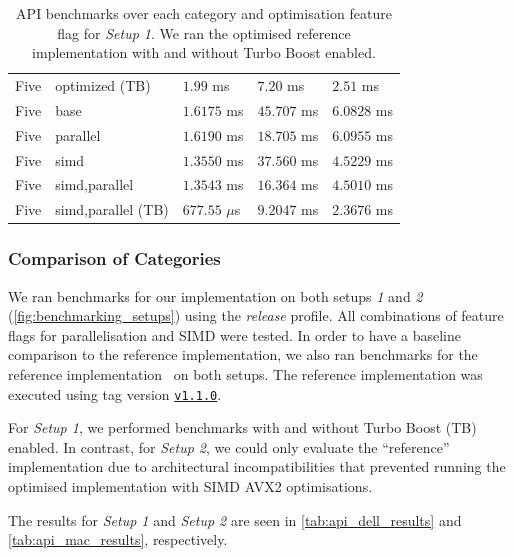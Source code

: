 \documentclass[11pt]{report}
\theoremstyle{definition}
\theoremstyle{plain}
\begin{document}
\begin{table}[H]
\begin{tabular}{l|l|lll}
    Five \cite{aguilar2023return}  & optimized (TB)     & $1.99$ ms       & $7.20$ ms   & $2.51$ ms       \\
    \arrayrulecolor{lightgray}\hline\arrayrulecolor{black}
    Five                           & base               & $1.6175$ ms     & $45.707$ ms & $6.0828$ ms     \\
    Five                           & parallel           & $1.6190$ ms     & $18.705$ ms & $6.0955$ ms     \\
    Five                           & simd               & $1.3550$ ms     & $37.560$ ms & $4.5229$ ms     \\
    Five                           & simd,parallel      & $1.3543$ ms     & $16.364$ ms & $4.5010$ ms     \\
    Five                           & simd,parallel (TB) & $677.55$ $\mu$s & $9.2047$ ms & $2.3676$ ms     \\
    \hline
  \end{tabular}
  \caption{API benchmarks over each category and optimisation feature flag for \textit{Setup 1}. We ran the optimised reference implementation \cite{aguilar2023return} with and without Turbo Boost enabled.}
  \label{tab:api_dell_results}
\end{table}

\subsubsection{Comparison of Categories}\label{sub:comparison_categories}

We ran benchmarks for our implementation on both setups \textit{1} and \textit{2} (\autoref{fig:benchmarking_setups}) using the \textit{release} profile. All combinations of feature flags for parallelisation and SIMD were tested. In order to have a baseline comparison to the reference implementation, we also ran benchmarks for the reference implementation~\cite{aguilar2023return} on both setups. The reference implementation was executed using tag version \href{https://github.com/sdith/sdith/releases/tag/v1.1.0}{\texttt{v1.1.0}}.

For \textit{Setup 1}, we performed benchmarks with and without Turbo Boost (TB) enabled. In contrast, for \textit{Setup 2}, we could only evaluate the ``reference'' implementation due to architectural incompatibilities that prevented running the optimised implementation with SIMD AVX2 optimisations.

The results for \textit{Setup 1} and \textit{Setup 2} are seen in \autoref{tab:api_dell_results} and \autoref{tab:api_mac_results}, respectively.
\end{document}
